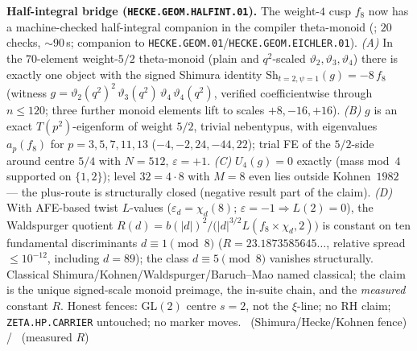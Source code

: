 \documentclass[11pt,a4paper]{article}
\theoremstyle{definition}
\begin{document}
\par\smallskip\noindent\textbf{Half-integral bridge
(\texttt{HECKE.GEOM.HALFINT.01}).}
The weight-$4$ cusp $f_8$ now has a machine-checked half-integral companion in the compiler
theta-monoid (; $20$ checks, $\sim90$\,s; companion to
\texttt{HECKE.GEOM.01}/\texttt{HECKE.GEOM.EICHLER.01}).
\emph{(A)} In the $70$-element weight-$5/2$ theta-monoid (plain and $q^2$-scaled
$\vartheta_2,\vartheta_3,\vartheta_4$) there is exactly one object with the signed Shimura
identity $\mathrm{Sh}_{t=2,\psi=1}(g)=-8\,f_8$ (witness
$g=\vartheta_2(q^2)^2\,\vartheta_3(q^2)\,\vartheta_4\,\vartheta_4(q^2)$, verified
coefficientwise through $n\le120$; three further monoid elements lift to scales
$+8,-16,+16$).
\emph{(B)} $g$ is an exact $T(p^2)$-eigenform of weight $5/2$, trivial nebentypus, with
eigenvalues $a_p(f_8)$ for $p=3,5,7,11,13$ ($-4,-2,24,-44,22$); trial FE of the
$5/2$-side around centre $5/4$ with $N=512$, $\varepsilon=+1$.
\emph{(C)} $U_4(g)=0$ exactly (mass mod~$4$ supported on $\{1,2\}$); level $32=4\cdot8$
with $M=8$ even lies outside Kohnen~$1982$ --- the plus-route is structurally closed
(negative result part of the claim).
\emph{(D)} With AFE-based twist $L$-values
($\varepsilon_d=\chi_d(8)$; $\varepsilon=-1\Rightarrow L(2)=0$), the Waldspurger quotient
$R(d)=b(|d|)^2\big/\bigl(|d|^{3/2}L(f_8\times\chi_d,2)\bigr)$ is constant on ten
fundamental discriminants $d\equiv1\pmod8$ ($R=23.1873585645\ldots$, relative spread
$\le10^{-12}$, including $d=89$); the class $d\equiv5\pmod8$ vanishes structurally.
Classical Shimura/Kohnen/Waldspurger/Baruch--Mao named classical; the claim is the unique
signed-scale monoid preimage, the in-suite chain, and the \emph{measured} constant $R$.
Honest fences: GL$(2)$ centre $s=2$, not the $\xi$-line; no RH claim;
\texttt{ZETA.HP.CARRIER} untouched; no marker moves.
\mE\ (Shimura/Hecke/Kohnen fence) / \mC\ (measured $R$)
\end{document}
